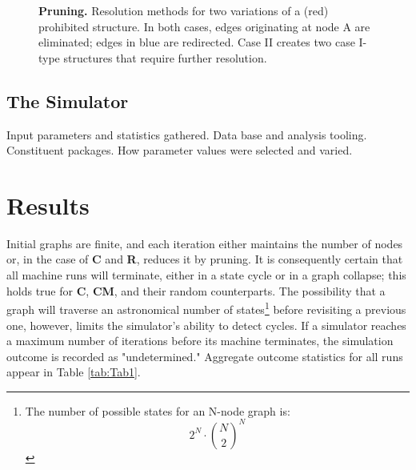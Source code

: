 \documentclass[twoside,twocolumn]{article}
\begin{document}
\begin{figure}[tb] 
    \centering
    \caption{\textbf{Pruning.} Resolution methods for two variations of a (red) prohibited structure.
In both cases, edges originating at node A are eliminated; edges in blue are redirected.
Case II creates two case I-type structures that require further resolution.}
    \label{fig:Fig2}
\end{figure}


\subsection{The Simulator}

Input parameters and statistics gathered. Data base and analysis tooling.
Constituent packages. How parameter values were selected and varied.


\section{Results}

Initial graphs are finite, and each iteration
either maintains the number of nodes or, in the case of \textbf{C} and \textbf{R},
reduces it by pruning.  It is consequently certain that all machine runs will terminate,
either in a state cycle or in a graph collapse; this holds true
for \textbf{C}, \textbf{CM}, and their random counterparts.
The possibility that a graph will traverse an astronomical number
of states\footnote{The number of possible states for an N-node graph is:
\[
2^N\cdot\binom{N}{2}^N
\]
}
before revisiting a previous one, however, limits the simulator's ability to
detect cycles. If a simulator reaches a maximum number of iterations
before its machine terminates, the simulation outcome is recorded as "undetermined."
Aggregate outcome statistics for all runs appear in Table \ref{tab:Tab1}.
\end{document}
